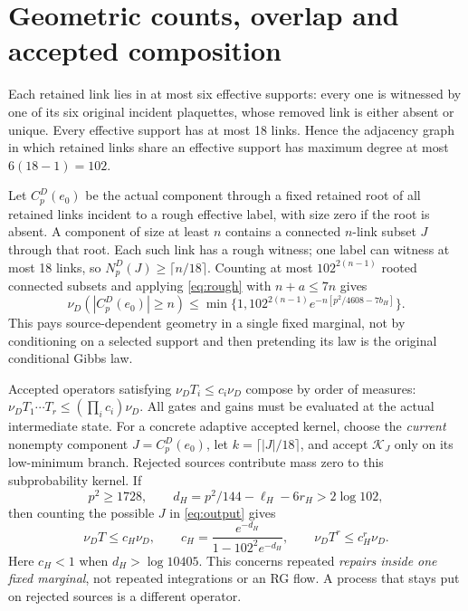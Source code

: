 \documentclass[11pt]{article}
\theoremstyle{definition}
\theoremstyle{remark}
\begin{document}
\section{Geometric counts, overlap and accepted composition}
Each retained link lies in at most six effective supports: every one
is witnessed by one of its six original incident plaquettes, whose
removed link is either absent or unique. Every effective support has
at most 18 links. Hence the adjacency graph in which retained links
share an effective support has maximum degree at most
$6(18-1)=102$.

Let $C_p^D(e_0)$ be the actual component through a fixed retained root of
all retained links incident to a rough effective label, with size zero
if the root is absent. A component of size at least $n$ contains a
connected $n$-link subset $J$ through that root. Each such link has a
rough witness; one label can witness at most 18 links, so
$N_p^D(J)\ge\lceil n/18\rceil$. Counting at most $102^{2(n-1)}$ rooted
connected subsets and applying \eqref{eq:rough} with $n+a\le7n$ gives
\begin{equation}
 \nu_D(|C_p^D(e_0)|\ge n)
 \le\min\{1,102^{2(n-1)}e^{-n[p^2/4608-7b_H]}\}.
 \label{eq:components}
\end{equation}
This pays source-dependent geometry in a single fixed marginal, not by
conditioning on a selected support and then pretending its law is the
original conditional Gibbs law.

Accepted operators satisfying $\nu_DT_i\le c_i\nu_D$ compose by order
of measures: $\nu_DT_1\cdots T_r\le(\prod_i c_i)\nu_D$.
All gates and gains must be evaluated at the actual intermediate state.
For a concrete adaptive accepted kernel, choose the \emph{current}
nonempty component $J=C_p^D(e_0)$, let $k=\lceil|J|/18\rceil$, and
accept $\mathcal K_J$ only on its low-minimum branch. Rejected sources
contribute mass zero to this subprobability kernel. If
\begin{equation}
 p^2\ge1728,\qquad d_H=p^2/144-\ell_H-6r_H>2\log102,
 \label{eq:adaptivebudget}
\end{equation}
then counting the possible $J$ in \eqref{eq:output} gives
\begin{equation}
 \nu_DT\le c_H\nu_D,\qquad
 c_H=\frac{e^{-d_H}}{1-102^2e^{-d_H}},\qquad
 \nu_DT^r\le c_H^r\nu_D.
 \label{eq:adaptive}
\end{equation}
Here $c_H<1$ when $d_H>\log10405$. This concerns repeated \emph{repairs
inside one fixed marginal}, not repeated integrations or an RG flow.
A process that stays put on rejected sources is a different operator.
\end{document}
